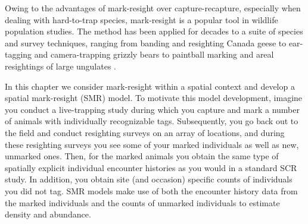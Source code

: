 Owing to the advantages of mark-resight over capture-recapture,
especially when dealing with hard-to-trap species, mark-resight is a
popular tool in wildlife population studies. The method has been
applied for decades
to a suite of species and survey techniques,
ranging from banding and resighting Canada geese
\citep{hestbeck_malecki:1989} to ear-tagging and camera-trapping
grizzly bears \citep{mace_etal:1994} to paintball marking and areal
resightings of large ungulates \citep{skalski_etal:2005jwm}.

In this chapter we consider mark-resight within
a spatial context and
develop a spatial mark-resight (SMR) model. To motivate this model
development, imagine you conduct a live-trapping study during which
you capture and mark a number of animals with individually
recognizable tags. Subsequently, you go back out to the field and
conduct resighting surveys on an array of locations, and during these
resighting surveys you see some of your marked individuals as well as
new, unmarked ones. Then, for the marked animals you obtain the same
type of spatially explicit individual encounter histories as you would
in a standard SCR study. In addition, you obtain site (and occasion)
specific counts of individuals you did not tag.
SMR models make use of
both the encounter history data from the marked individuals and the
counts of unmarked individuals to estimate density and abundance.

